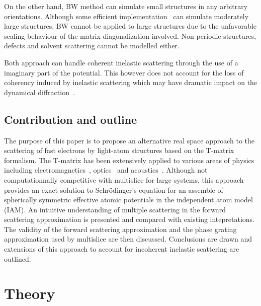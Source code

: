 On the other hand, BW method can simulate small structures in any arbitrary
orientations. Although some efficient implementation~\cite{Zuo1995} can simulate
moderately large structures, BW cannot be applied to large structures due to
the unfavorable scaling behaviour of the matrix diagonalization involved.
Non periodic structures, defects and solvent scattering cannot be modelled either.

Both approach can handle coherent inelastic scattering through the use of
a imaginary part of the potential. This however does not account for the
loss of coherency induced by inelastic scattering which may have dramatic
impact on the dynamical diffraction~\cite{Latychevskaia2019}.


\subsection{Contribution and outline}

The purpose of this paper is to propose an alternative real space approach
to the scattering of fast electrons by light-atom structures based on
the T-matrix formalism.
The T-matrix has been extensively applied to various areas of physics including
electromagnetics~\cite{Hamid1990,Hamid1990_b,Eremin1995}, optics~\cite{Moine2005}
and acoustics~\cite{Silva2012,Godin2011}.
Although not computationnally competitive with multislice
for large systems, this approach provides an exact solution to Schr{\"o}dinger's
equation for an assemble of spherically symmetric effective atomic potentials in
the independent atom model (IAM).
An intuitive understanding of multiple scattering in the forward scattering
approximation is presented and compared with existing intepretations.
The validity of the forward scattering approximation and the phase grating
approximation used by multislice are then discussed.
Conclusions are drawn and extensions of this approach to account for incoherent
inelastic scattering are outlined.





\section{Theory}

